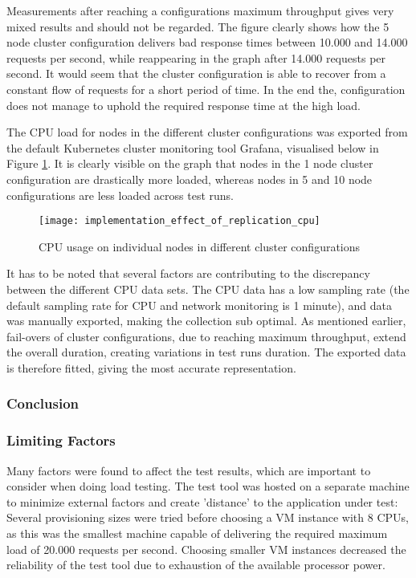 Measurements after reaching a configurations maximum throughput gives very mixed results and should not be regarded. The figure clearly shows how the 5 node cluster configuration delivers bad response times between 10.000 and 14.000 requests per second, while reappearing in the graph after 14.000 requests per second. It would seem that the cluster configuration is able to recover from a constant flow of requests for a short period of time. In the end the, configuration does not manage to uphold the required response time at the high load.

The CPU load for nodes in the different cluster configurations was exported from the default Kubernetes cluster monitoring tool Grafana, visualised below in Figure \ref{fig:implementation_effect_of_replication_cpu}. It is clearly visible on the graph that nodes in the 1 node cluster configuration are drastically more loaded, whereas nodes in 5 and 10 node configurations are less loaded across test runs.

\begin{figure}[!htb]
  \texttt{[image: implementation\_effect\_of\_replication\_cpu]}  
  \caption{CPU usage on individual nodes in different cluster configurations}
  \label{fig:implementation_effect_of_replication_cpu}
\end{figure}

It has to be noted that several factors are contributing to the discrepancy between the different CPU data sets. The CPU data has a low sampling rate (the default sampling rate for CPU and network monitoring is 1 minute), and data was manually exported, making the collection sub optimal. As mentioned earlier, fail-overs of cluster configurations, due to reaching maximum throughput, extend the overall duration, creating variations in test runs duration. The exported data is therefore fitted, giving the most accurate representation.


\subsubsection{Conclusion}



\subsubsection{Limiting Factors}
Many factors were found to affect the test results, which are important to consider when doing load testing. The test tool was hosted on a separate machine to minimize external factors and create 'distance' to the application under test: Several provisioning sizes were tried before choosing a VM instance with 8 CPUs, as this was the smallest machine capable of delivering the required maximum load of 20.000 requests per second. Choosing smaller VM instances decreased the reliability of the test tool due to exhaustion of the available processor power.

